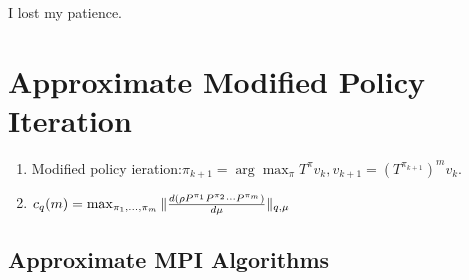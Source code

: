 \documentclass[a4paper]{article}
\begin{document}
I lost my patience.

\section{Approximate Modified Policy Iteration}%
\begin{enumerate}
    \item Modified policy ieration:$ \pi_{k+1} = \arg\max_{\pi} T^{\pi} v_k, v_{k+1} = {(T^{\pi_{k+1}})}^{m} v_k $.
    \item $ c_q(m) = \max_{\pi_1, \ldots, \pi_m} \Arrowvert \frac{d(\rho P^{\pi_1} P^{\pi_2} \cdots P^{\pi_m})}{d \mu}  \Arrowvert_{q, \mu} $
\end{enumerate}
\subsection{Approximate MPI Algorithms}%
\label{sub:approximate_mpi_algorithms}
\end{document}
